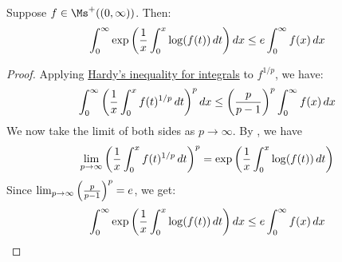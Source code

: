 \documentclass[main.tex]{subfiles}
\begin{document}
\begin{theorem}
    Suppose $f\in\Ms^+((0,\infty))$. Then:
    \begin{equation*}
        \int_0^\infty \exp\qty(\frac{1}{x}\int_0^x \log(f(t))\,dt)\,dx
        \le e\int_0^\infty f(x)\,dx
    \end{equation*}
\end{theorem}
\begin{proof}
    Applying \hyperref[hardys_inequality_for_integrals]{Hardy's inequality for integrals} to $f^{1/p}$, we have:
    \begin{equation*}
        \int_0^\infty \qty(\frac{1}{x}\int_0^x f(t)^{1/p}\,dt)^p\,dx
        \le\qty(\frac{p}{p-1})^p\int_0^\infty f(x)\,dx
    \end{equation*}
    We now take the limit of both sides as $p\to\infty$. By , we have
    \begin{equation*}
        \lim_{p\to\infty} \qty(\frac{1}{x}\int_0^x f(t)^{1/p}\,dt)^p
        = \exp\qty(\frac{1}{x}\int_0^x \log(f(t))\,dt)
    \end{equation*}
    Since $\lim_{p\to\infty} \qty(\frac{p}{p-1})^p=e$, we get:
    \begin{equation*}
        \int_0^\infty \exp\qty(\frac{1}{x}\int_0^x \log(f(t))\,dt)\,dx
        \le e\int_0^\infty f(x)\,dx
    \end{equation*}
\end{proof}
\end{document}
